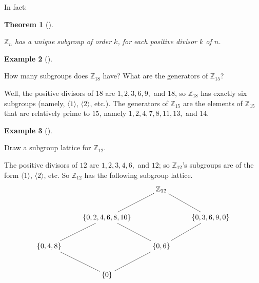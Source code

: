 \documentclass[10pt,]{book}
\theoremstyle{plain}
\newtheorem{theorem}{Theorem}[section]
\theoremstyle{definition}
\theoremstyle{definition}
\theoremstyle{definition}
\newtheorem{example}[theorem]{Example}
\theoremstyle{definition}
\numberwithin{equation}{section}
\def\Z{\mathbb{Z}}
\begin{document}
    In fact:
\begin{theorem}[{}]\label{theorem-29}

        \(\Z_n\) has a unique subgroup of order \(k\), for each positive divisor \(k\) of \(n\).
\end{theorem}
\begin{example}[]\label{example-48}

        How many subgroups does \(\Z_{18}\) have? What are the generators of \(\Z_{15}\)?
\par

        Well, the positive divisors of \(18\) are \(1,2,3,6,9,\) and \(18\), so \(\Z_{18}\) has exactly six subgroups (namely, \(\langle 1\rangle\), \(\langle 2\rangle\), etc.).
        The generators of \(\Z_{15}\) are the elements of \(\Z_{15}\) that are relatively prime to \(15\), namely \(1,2,4,7,8,11,13,\) and \(14\).
\end{example}
\begin{example}[]\label{example-49}

        Draw a subgroup lattice for \(\Z_{12}\).
\par

        The positive divisors of \(12\) are \(1,2,3,4,6,\) and \(12\); so
        \(\Z_{12}\)'s subgroups are of the form \(\langle 1\rangle\), \(\langle 2\rangle\), etc. So
        \(\Z_{12}\) has the following subgroup lattice.
{
      \[ \xymatrix{
& &\Z_{12} \ar@{-}[ld] \ar@{-}[rd]&\\
&\{0,2,4,6,8,10\} \ar@{-}[ld]\ar@{-}[rd]& &\{0, 3,6,9,0\} \ar@{-}[ld]\\ \{0,4,8\}\ar@{-}[dr]& & \{0,6\} \ar@{-}[dl]& \\
& \{0\} & &} \]
}
\end{example}
\typeout{************************************************}
\typeout{************************************************}
\end{document}
